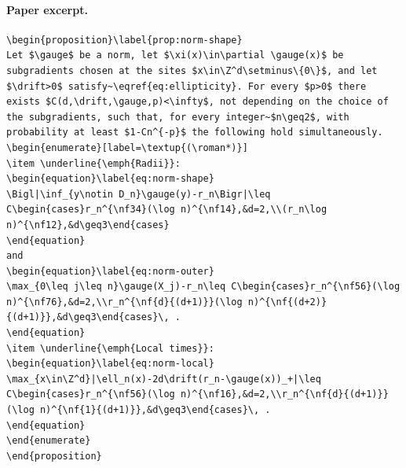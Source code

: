 \paragraph{Paper excerpt.}
\begin{verbatim}
\begin{proposition}\label{prop:norm-shape}
Let $\gauge$ be a norm, let $\xi(x)\in\partial \gauge(x)$ be subgradients chosen at the sites $x\in\Z^d\setminus\{0\}$, and let $\drift>0$ satisfy~\eqref{eq:ellipticity}. For every $p>0$ there exists $C(d,\drift,\gauge,p)<\infty$, not depending on the choice of the subgradients, such that, for every integer~$n\geq2$, with probability at least $1-Cn^{-p}$ the following hold simultaneously.
\begin{enumerate}[label=\textup{(\roman*)}]
\item \underline{\emph{Radii}}:
\begin{equation}\label{eq:norm-shape}
\Bigl|\inf_{y\notin D_n}\gauge(y)-r_n\Bigr|\leq C\begin{cases}r_n^{\nf34}(\log n)^{\nf14},&d=2,\\(r_n\log n)^{\nf12},&d\geq3\end{cases}
\end{equation}
and
\begin{equation}\label{eq:norm-outer}
\max_{0\leq j\leq n}\gauge(X_j)-r_n\leq C\begin{cases}r_n^{\nf56}(\log n)^{\nf76},&d=2,\\r_n^{\nf{d}{(d+1)}}(\log n)^{\nf{(d+2)}{(d+1)}},&d\geq3\end{cases}\, .
\end{equation}
\item \underline{\emph{Local times}}:
\begin{equation}\label{eq:norm-local}
\max_{x\in\Z^d}|\ell_n(x)-2d\drift(r_n-\gauge(x))_+|\leq C\begin{cases}r_n^{\nf56}(\log n)^{\nf16},&d=2,\\r_n^{\nf{d}{(d+1)}}(\log n)^{\nf{1}{(d+1)}},&d\geq3\end{cases}\, .
\end{equation}
\end{enumerate}
\end{proposition}
\end{verbatim}
